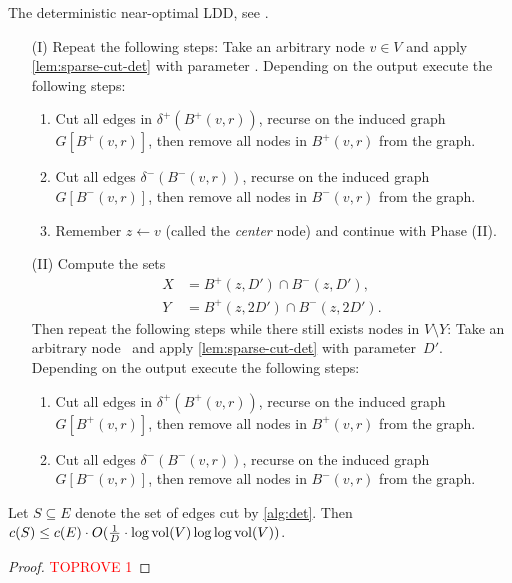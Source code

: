 \begin{algorithm}[t]
	\caption{The deterministic near-optimal LDD, see .} \label{alg:det}
	\begin{enumerate}[label=\arabic*.]
		\item[(I)] Repeat the following steps: Take an arbitrary node $v \in V$ and apply \cref{lem:sparse-cut-det} with parameter . Depending on the output execute the following steps:
		\begin{enumerate}[label=(\roman*)]
			\item Cut all edges in $\delta^+(B^+(v, r))$, recurse on the induced graph $G[B^+(v, r)]$, then remove all nodes in $B^+(v, r)$ from the graph.
			\item Cut all edges $\delta^-(B^-(v, r))$, recurse on the induced graph $G[B^-(v, r)]$, then remove all nodes in $B^-(v, r)$ from the graph.
			\item Remember $z \gets v$ (called the \emph{center} node) and continue with Phase (II).
		\end{enumerate}
		\item[(II)] Compute the sets
		\begin{align*}
			X &= B^+(z, D') \cap B^-(z, D'), \\
			Y &= B^+(z, 2D') \cap B^-(z, 2D').
		\end{align*}
		Then repeat the following steps while there still exists nodes in $V \setminus Y$: Take an arbitrary node~ and apply \cref{lem:sparse-cut-det} with parameter~$D'$. Depending on the output execute the following steps:
		\begin{enumerate}[label=(\roman*)]
			\item Cut all edges in $\delta^+(B^+(v, r))$, recurse on the induced graph $G[B^+(v, r)]$, then remove all nodes in $B^+(v, r)$ from the graph.
			\item Cut all edges $\delta^-(B^-(v, r))$, recurse on the induced graph $G[B^-(v, r)]$, then remove all nodes in $B^-(v, r)$ from the graph.
		\end{enumerate}
	\end{enumerate}
\end{algorithm}

\begin{lemma} \label{lem:ldd-det-cost}
Let $S \subseteq E$ denote the set of edges cut by \cref{alg:det}. Then $c(S) \leq c(E) \cdot O(\frac{1}{D} \cdot \log \operatorname{vol}(V) \log\log \operatorname{vol}(V))$.
\end{lemma}
\begin{proof}\textcolor{red}{TOPROVE 1}\end{proof}

